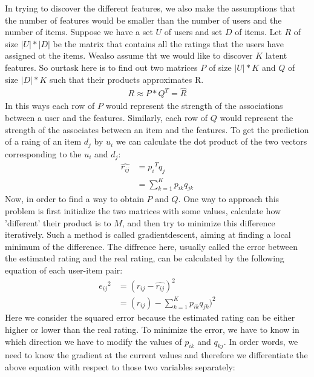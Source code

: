 In trying to discover the different features, we also make the assumptions that the number of features would be smaller than the number of users and the number of items. Suppose we have a set $U$ of users and set $D$ of items. Let $R$ of size $|U| * |D| $ be the matrix that contains all the ratings that the users have assigned ot the items. Wealso assume tht we would like to discover $K$ latent features. So ourtask here is to find out two matrices $P$ of size $|U| * K$ and $Q$ of size ${|D| * K}$ such that their products approximates R.
\begin{equation}
\begin{split}
	R \approx P*Q^T = \widehat{R}
\end{split}
\end{equation}
In this ways each row of $P$ would represent the strength of the associations between a user and the features. Similarly, each row of $Q$ would represent the strength of the associates between an item and the features. To get the prediction of a raing of an item $d_j$ by $u_i$ we can calculate the dot product of the two vectors corresponding to the $u_i$ and $d_j$:
\begin{equation}
\begin{split}
	\widehat{r_{ij}} & = {p_i}^Tq_j \\
	 & = {\sum_{k=1}^K} p_{ik}q_{jk}
\end{split}
\end{equation}
Now, in order to find a way to obtain $P$ and $Q$. One way to approach this problem is first initialize the two matrices with some values, calculate how 'different' their product is to $M$, and then try to minimize this difference iteratively. Such a method is called gradientdescent, aiming at finding a local minimum of the difference. The diffrence here, usually called the error between the estimated rating and the real rating, can be calculated by the following equation of each user-item pair:
\begin{equation}
\begin{split}
	{e_{ij}}^2 & = (r_{ij} - \widehat{r_{ij}})^2 \\ 
	& = (r_{ij}) - {\sum_{k=1}^K} p_{ik}q_{jk})^2
\end{split}
\end{equation}
Here we consider the squared error because the estimated rating can be either higher or lower than the real rating.
To minimize the error, we have to know in which direction we have to modify the values of $p_{ik}$ and $q_{kj}$. In order words, we need to know the gradient at the current values and therefore we differentiate the above equation with respect to those two variables separately:
